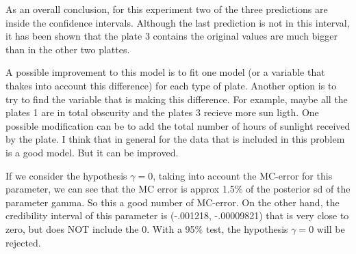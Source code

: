 \documentclass{article}
\begin{document}
As an overall conclusion, for this experiment two of the three predictions are inside the confidence intervals. Although the last prediction is not in this interval, it has been shown that the plate 3 contains the original values are much bigger than in the other two plattes. 

A possible improvement to this model is to fit one model (or a variable that thakes into account this difference) for each type of plate. Another option is to try to find the variable that is making this difference. For example, maybe all the plates 1 are in total obscurity and the plates 3 recieve more sun ligth. One possible modification can be to add the total number of hours of sunlight received by the plate. I think that in general for the data that is included in this problem is a good model. But it can be improved.

If we consider the hypothesis $\gamma = 0$, taking into account the MC-error for this parameter, we can see that the MC error is approx 1.5\% of the posterior sd of the parameter gamma. So this a good number of MC-error. On the other hand, the credibility interval of this parameter is (-.001218, -.00009821) that is very close to zero, but does NOT include the 0. With a 95\% test, the hypothesis $\gamma = 0$ will be rejected.
\end{document}
